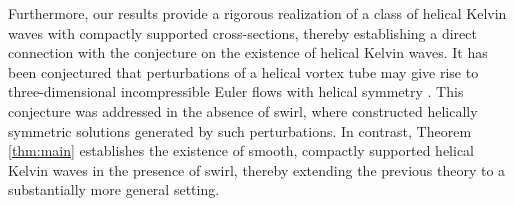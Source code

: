 \documentclass[12pt,reqno]{amsart}
\numberwithin{equation}{section}
\theoremstyle{definition}
\theoremstyle{remark}
\begin{document}
Furthermore, our results provide a rigorous realization of a class of helical Kelvin waves with compactly supported cross-sections, thereby establishing a direct connection with the conjecture on the existence of helical Kelvin waves. It has been conjectured that perturbations of a helical vortex tube may give rise to three-dimensional incompressible Euler flows with helical symmetry \cite{LucasDritschel}. This conjecture was  addressed in the absence of swirl, where \cite{CaoFanLiQin2026} constructed helically symmetric solutions generated by such perturbations. In contrast, Theorem \ref{thm:main} establishes the existence of smooth, compactly supported helical Kelvin waves in the presence of swirl, thereby extending the previous theory to a substantially more general setting.


\end{document}
